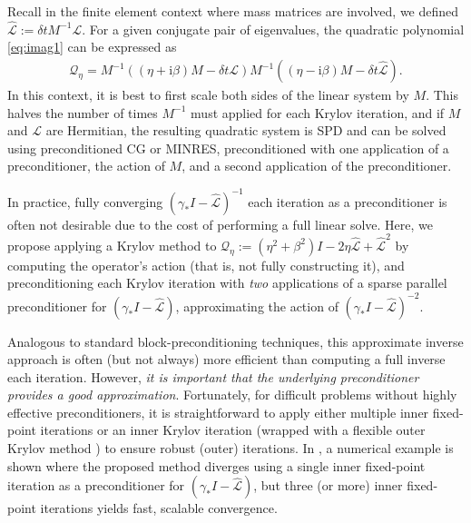 \documentclass[review]{siamart}
\begin{document}
\begin{remark}
Recall in the finite element context where mass matrices are involved, we defined
$\widehat{\mathcal{L}} := \delta t M^{-1}\mathcal{L}$. For a given conjugate pair
of eigenvalues, the quadratic polynomial \eqref{eq:imag1} can be expressed as
%
\begin{align}\label{eq:scaleM}
\mathcal{Q}_\eta = M^{-1}((\eta + \mathrm{i} \beta)M - \delta t{\mathcal{L}})M^{-1}((\eta - \mathrm{i} \beta)M -
	\delta t\widehat{\mathcal{L}}).
\end{align}
%
In this context, it is best to first scale both sides of the linear system by $M$.
This halves the number of times $M^{-1}$ must applied for each Krylov iteration,
and if $M$ and $\mathcal{L}$ are Hermitian, the resulting quadratic system is SPD
and can be solved using preconditioned CG or MINRES, preconditioned
with one application of a preconditioner, the action of $M$, and a second application
of the preconditioner.
\end{remark}

\begin{remark}\label{sec:inexact-precond}
In practice, fully converging $(\gamma_* I - \widehat{\mathcal{L}})^{-1}$
each iteration as a preconditioner is often not desirable due to the cost
of performing a full linear solve. Here, we propose
applying a Krylov method to $\mathcal{Q}_\eta:=(\eta^2+\beta^2)I - 2\eta\widehat{\mathcal{L}} +
\widehat{\mathcal{L}}^2$ by computing the operator's action (that is, not fully constructing
it), and preconditioning each Krylov iteration with \textit{two} applications of a sparse
parallel preconditioner for $(\gamma_* I - \widehat{\mathcal{L}})$, approximating the action
of $(\gamma_* I - \widehat{\mathcal{L}})^{-2}$.

Analogous to standard block-preconditioning techniques, this approximate inverse
approach is often (but not always) more efficient than computing a full inverse
each iteration. However, \textit{it is important that the underlying preconditioner
provides a good approximation}.
Fortunately, for difficult problems without highly effective
preconditioners, it is straightforward to apply either multiple inner fixed-point iterations
or an inner Krylov iteration (wrapped with a flexible outer Krylov method
\cite{Notay2000,saad1993flexible}) to ensure robust (outer) iterations.
In , a
numerical example is shown where the proposed method diverges using a single inner
fixed-point iteration as a preconditioner for $(\gamma_* I - \widehat{\mathcal{L}})$, but
three (or more) inner fixed-point iterations yields fast, scalable convergence. 
\end{remark}
\end{document}
